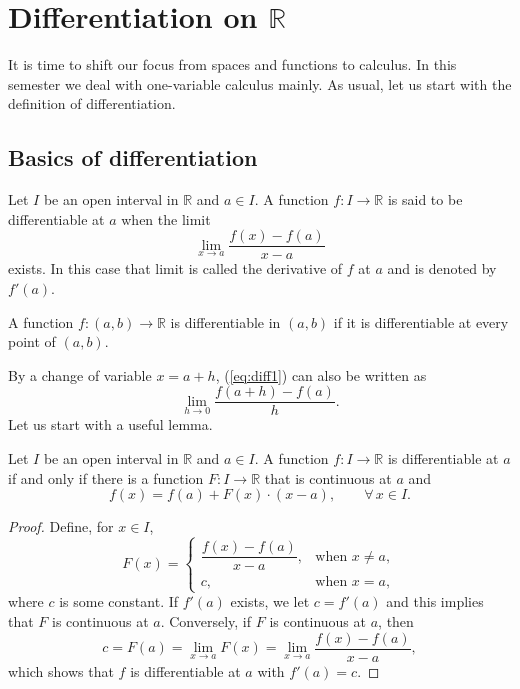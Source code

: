 \chapter{Differentiation on $\mathbb{R}$} 
\label{chap:diff}

It is time to shift our focus from spaces and functions to calculus.
In this semester we deal with one-variable calculus mainly.
As usual, let us start with the definition of differentiation.

\section{Basics of differentiation}
\label{sec:diff-def}

\begin{defn}
  Let $I$ be an open interval in $\mathbb{R}$ and $a \in I$.
  A function $f: I \to \mathbb{R}$ is said to be \textsf{differentiable} at $a$ when the limit
  \begin{equation}
    \label{eq:diff1}
    \lim_{x \to a} \frac{ f(x) - f(a) }{ x - a } 
  \end{equation}
  exists.  In this case that limit is called the \textsf{derivative} of $f$ at $a$ and is denoted by $f'(a)$.

  A function $f : (a,b) \to \mathbb{R}$ is \textsf{differentiable} in $(a,b)$ if it is differentiable at every point of $(a,b)$.
\end{defn}

By a change of variable $x = a + h$, (\ref{eq:diff1}) can also be written as
\begin{equation}
  \label{eq:diff2}
  \lim_{h \to 0} \frac{f(a+h)-f(a)}{h}.
\end{equation}
Let us start with a useful lemma.

\begin{thm}
  \label{thm:caratheodory}
  Let $I$ be an open interval in $\mathbb{R}$ and $a \in I$.
  A function $f : I \to \mathbb{R}$ is differentiable at $a$ if and only if there is a function $F : I \to \mathbb{R}$ that is continuous at $a$ and
  \[
    f(x) = f(a) + F(x) \cdot (x-a), \qquad \forall \, x \in I.
  \]
\end{thm}

\begin{proof}
  Define, for $x \in I$,
  \[
    F(x) = 
    \begin{cases}
      \dfrac{f(x) - f(a)}{x-a}, & \text{when $x \ne a$}, \\
      c, & \text{when $x = a$},
    \end{cases}
  \]
  where $c$ is some constant.
  If $f'(a)$ exists, we let $c = f'(a)$ and this implies that $F$ is continuous at $a$.
  Conversely, if $F$ is continuous at $a$, then
  \[
    c = F(a) = \lim_{x \to a} F(x) = \lim_{x \to a} \frac{ f(x) - f(a) }{ x - a },
  \]
  which shows that $f$ is differentiable at $a$ with $f'(a) = c$.
\end{proof}

